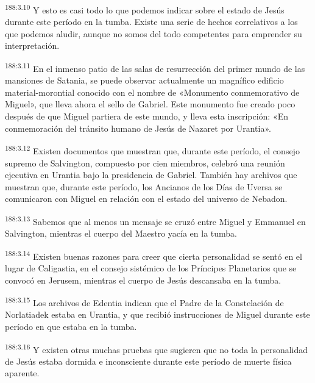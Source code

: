 \par
\textsuperscript{188:3.10} Y esto es casi todo lo que podemos indicar sobre el estado de Jesús durante este período en la tumba. Existe una serie de hechos correlativos a los que podemos aludir, aunque no somos del todo competentes para emprender su interpretación.

\par
\textsuperscript{188:3.11} En el inmenso patio de las salas de resurrección del primer mundo de las mansiones de Satania, se puede observar actualmente un magnífico edificio material-morontial conocido con el nombre de «Monumento conmemorativo de Miguel», que lleva ahora el sello de Gabriel. Este monumento fue creado poco después de que Miguel partiera de este mundo, y lleva esta inscripción: «En conmemoración del tránsito humano de Jesús de Nazaret por Urantia».

\par
\textsuperscript{188:3.12} Existen documentos que muestran que, durante este período, el consejo supremo de Salvington, compuesto por cien miembros, celebró una reunión ejecutiva en Urantia bajo la presidencia de Gabriel. También hay archivos que muestran que, durante este período, los Ancianos de los Días de Uversa se comunicaron con Miguel en relación con el estado del universo de Nebadon.

\par
\textsuperscript{188:3.13} Sabemos que al menos un mensaje se cruzó entre Miguel y Emmanuel en Salvington, mientras el cuerpo del Maestro yacía en la tumba.

\par
\textsuperscript{188:3.14} Existen buenas razones para creer que cierta personalidad se sentó en el lugar de Caligastia, en el consejo sistémico de los Príncipes Planetarios que se convocó en Jerusem, mientras el cuerpo de Jesús descansaba en la tumba.

\par
\textsuperscript{188:3.15} Los archivos de Edentia indican que el Padre de la Constelación de Norlatiadek estaba en Urantia, y que recibió instrucciones de Miguel durante este período en que estaba en la tumba.

\par
\textsuperscript{188:3.16} Y existen otras muchas pruebas que sugieren que no toda la personalidad de Jesús estaba dormida e inconsciente durante este período de muerte física aparente.


